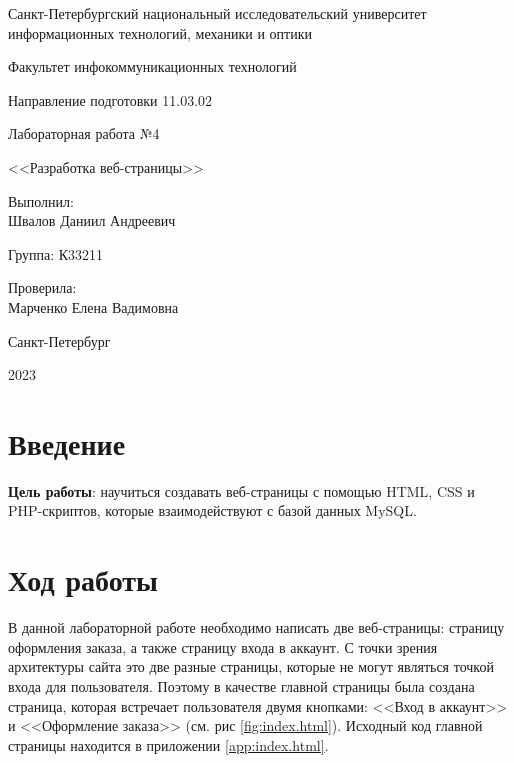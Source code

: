 \documentclass[a4paper, 14pt]{extarticle}
\begin{document}
\begin{titlepage}
  \vspace{0pt plus2fill}
  \noindent

  \vspace{0pt plus6fill}
  \begin{center}
    Санкт-Петербургский национальный исследовательский университет
    информационных технологий, механики и оптики

    \vspace{0pt plus3fill}

    Факультет инфокоммуникационных технологий

    Направление подготовки 11.03.02

    \vspace{0pt plus2fill}

    Лабораторная работа №4

    <<Разработка веб-страницы>>

  \end{center}

  \vspace{0pt plus9fill}
  \begin{flushright}
    Выполнил: \\
    Швалов Даниил Андреевич

    Группа: К33211

    Проверила: \\
    Марченко Елена Вадимовна
  \end{flushright}

  \vspace{0pt plus2fill}
  \begin{center}
    Санкт-Петербург

    2023
  \end{center}
\end{titlepage}

\section{Введение}

\textbf{Цель работы}: научиться создавать веб-страницы с помощью HTML, CSS и
PHP-скриптов, которые взаимодействуют с базой данных MySQL.

\section{Ход работы}

В данной лабораторной работе необходимо написать две веб-страницы: страницу
оформления заказа, а также страницу входа в аккаунт. С точки зрения архитектуры
сайта это две разные страницы, которые не могут являться точкой входа для
пользователя. Поэтому в качестве главной страницы была создана страница, которая
встречает пользователя двумя кнопками: <<Вход в аккаунт>> и <<Оформление
заказа>> (см. рис \ref{fig:index.html}). Исходный код главной страницы находится
в приложении \ref{app:index.html}.
\end{document}
